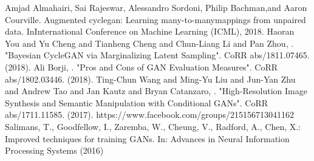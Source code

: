 \documentclass[12pt]{report}
\begin{document}
\begin{thebibliography}{9}
	 Amjad  Almahairi,  Sai  Rajeswar,  Alessandro  Sordoni,  Philip  Bachman,and  Aaron  Courville.    Augmented  cyclegan:  Learning  many-to-manymappings from unpaired data.  InInternational Conference on Machine Learning (ICML), 2018.
	 Haoran You and Yu Cheng and Tianheng Cheng and Chun-Liang Li and Pan Zhou, . "Bayesian CycleGAN via Marginalizing Latent Sampling". CoRR abs/1811.07465. (2018).
	 Ali Borji, . "Pros and Cons of GAN Evaluation Measures". CoRR abs/1802.03446. (2018).
	 Ting-Chun Wang and Ming-Yu Liu and Jun-Yan Zhu and Andrew Tao and Jan Kautz and Bryan Catanzaro, . "High-Resolution Image Synthesis and Semantic Manipulation with Conditional GANs". CoRR abs/1711.11585. (2017).
	 https://www.facebook.com/groups/215156713041162
	 Salimans, T., Goodfellow, I., Zaremba, W., Cheung, V., Radford, A., Chen, X.: Improved techniques for training GANs. In: Advances in Neural Information Processing Systems (2016)
\end{thebibliography}
\end{document}
